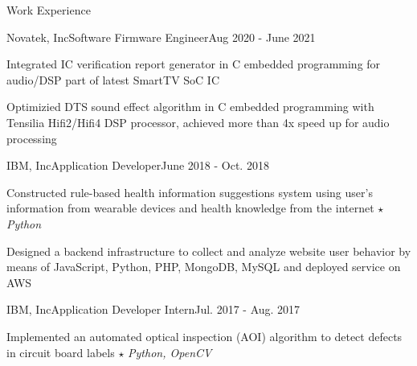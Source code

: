\documentclass{resume_short} %
\begin{document}
\begin{rSection}{Work Experience}
    \begin{rSubsection3}{Novatek, Inc}{Software Firmware Engineer}{Aug 2020 - June 2021}
        \item Integrated IC verification report generator in C embedded programming for audio/DSP part of latest SmartTV SoC IC
        \item Optimizied DTS sound effect algorithm in C embedded programming with Tensilia Hifi2/Hifi4 DSP processor, achieved more than 4x speed up for audio processing
    \end{rSubsection3}
    \begin{rSubsection3}{IBM, Inc}{Application Developer}{June 2018 - Oct. 2018}
        \item Constructed rule-based health information suggestions system using user's information from wearable devices and health knowledge from the internet $\star$ {\em Python}
        \item Designed a backend infrastructure to collect and analyze website user behavior by means of JavaScript, Python, PHP, MongoDB, MySQL and deployed service on AWS
    \end{rSubsection3}
    \begin{rSubsection3}{IBM, Inc}{Application Developer Intern}{Jul. 2017 - Aug. 2017}
        \item Implemented an automated optical inspection (AOI) algorithm to 
              detect defects in circuit board labels $\star$ {\em Python, OpenCV}
    \end{rSubsection3}
\end{rSection}
\end{document}
